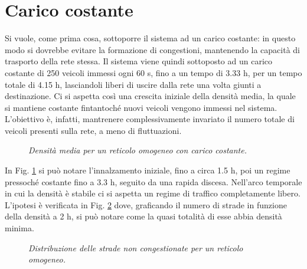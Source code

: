 \documentclass[../main.tex]{subfiles}
\begin{document}
\section{Carico costante}
Si vuole, come prima cosa, sottoporre il sistema ad un carico costante: in questo modo si dovrebbe evitare la formazione di congestioni, mantenendo la capacit\`a di trasporto della rete stessa.
Il sistema viene quindi sottoposto ad un carico costante di 250 veicoli immessi ogni 60 s, fino a un tempo di 3.33 h, per un tempo totale di 4.15 h, lasciandoli liberi di uscire dalla rete una volta giunti a destinazione.
Ci si aspetta cos\`i una crescita iniziale della densit\`a media, la quale si mantiene costante fintantoch\'e nuovi veicoli vengono immessi nel sistema.
L'obiettivo \`e, infatti, mantrenere complessivamente invariato il numero totale di veicoli presenti sulla rete, a meno di fluttuazioni.
\begin{figure}[H]
    \centering
    \caption[Densit\`a media per un reticolo omogeneo con carico costante]{\emph{Densit\`a media per un reticolo omogeneo con carico costante.}}
    \label{fig:density_constant_homo}
\end{figure}
In Fig. \ref{fig:density_constant_homo} si pu\`o notare l'innalzamento iniziale, fino a circa 1.5 h, poi un regime pressoch\'e costante fino a 3.3 h, seguito da una rapida discesa.
Nell'arco temporale in cui la densit\`a \`e stabile ci si aspetta un regime di traffico completamente libero.
L'ipotesi \`e verificata in Fig. \ref{fig:nStreet_density_constant_homo} dove, graficando il numero di strade in funzione della densit\`a a 2 h, si pu\`o notare come la quasi totalit\`a di esse abbia densit\`a minima.
\begin{figure}[H]
    \centering
    \caption[Distribuzione delle strade non congestionate per un reticolo omogeneo.]{\emph{Distribuzione delle strade non congestionate per un reticolo omogeneo.}}
    \label{fig:nStreet_density_constant_homo}
\end{figure}
\end{document}
